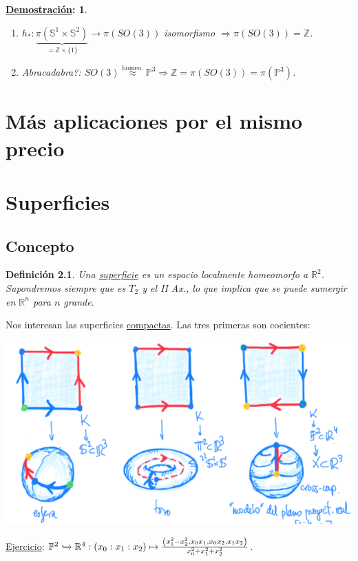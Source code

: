\documentclass[10pt,a4paper,openright]{book}
\theoremstyle{break}
\newtheorem*{defi}{Definición}
\newtheorem*{demo}{\underline{Demostración}:}
\begin{document}
\begin{demo}
\begin{enumerate}
    \item $h_*: \underbrace{\pi\left( \mathbb{S}^{1} \times \mathbb{S}^{2} \right)}_{= \mathbb{Z} \times \{1\}} \rightarrow \pi\left( SO\left( 3 \right) \right)$ isomorfismo $\Rightarrow \pi\left( SO\left( 3 \right) \right) = \mathbb{Z}$.

    \item Abracadabra?: $SO\left( 3 \right) \stackrel{\text{homeo.}}{\approx} \mathbb{P}^{3} \Rightarrow \mathbb{Z} = \pi\left( SO\left( 3 \right) \right) = \pi \left( \mathbb{P}^{3} \right)$.
\end{enumerate}
\end{demo}


\chapter{Más aplicaciones por el mismo precio}%
\label{cha:mas_aplicaciones_por_el_mismo_precio}

\chapter{Superficies}%
\label{cha:superficies}
\section{Concepto}%
\label{sec:concepto_sup}
\begin{defi}
Una \underline{superficie} es un espacio localmente homeomorfo a $\mathbb{R}^{2}$. Supondremos siempre que es $T_2$ y el II Ax., lo que implica que se puede sumergir en $\mathbb{R}^{n}$ para $n$ grande.
\end{defi}
Nos interesan las superficies \underline{compactas}. Las tres primeras son cocientes:
\begin{center}
    \includegraphics[scale=0.3]{images/primeras_superficies} 
\end{center}
\underline{Ejercicio}: $\mathbb{P}^{2} \xhookrightarrow{} \mathbb{R}^{4}: \left( x_0 : x_1 : x_2 \right) \mapsto \frac{\left( x_1^2 - x_2^2, x_0x_1, x_0x_2, x_1x_2 \right)}{x_0^2 + x_1^2 + x_2^2}$.
\end{document}
